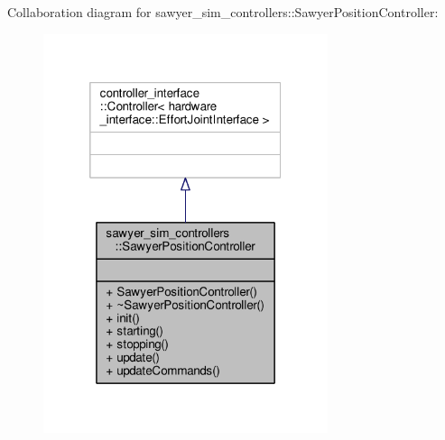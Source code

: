 Collaboration diagram for sawyer\-\_\-sim\-\_\-controllers\-:\-:Sawyer\-Position\-Controller\-:
\nopagebreak
\begin{figure}[H]
\begin{center}
\leavevmode
\includegraphics[width=236pt]{classsawyer__sim__controllers_1_1_sawyer_position_controller__coll__graph}
\end{center}
\end{figure}
